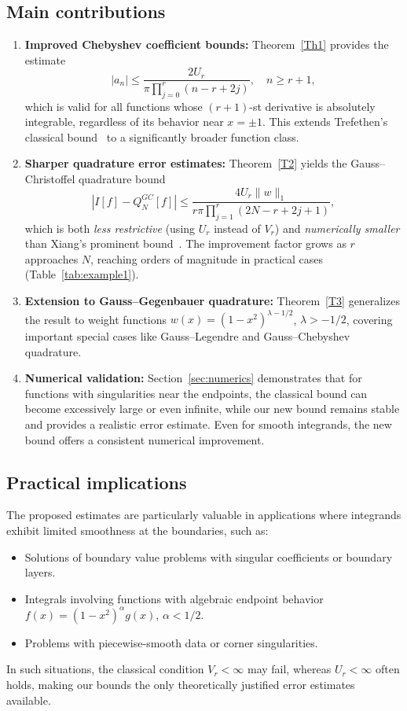 \documentclass[12pt,a4paper]{article}
\begin{document}
\subsection*{Main contributions}
\begin{enumerate}
    \item \textbf{Improved Chebyshev coefficient bounds:} Theorem~\ref{Th1} provides the estimate
    \[
    |a_n| \leq \frac{2U_r}{\pi\prod_{j=0}^{r}(n-r+2j)}, \quad n \ge r+1,
    \]
    which is valid for all functions whose $(r+1)$-st derivative is absolutely integrable, regardless of its behavior near $x = \pm 1$. This extends Trefethen's classical bound~\cite{LN} to a significantly broader function class.
    
    \item \textbf{Sharper quadrature error estimates:} Theorem~\ref{T2} yields the Gauss--Christoffel quadrature bound
    \[
    |I[f]-Q_N^{GC}[f]| \leq \frac{4U_r \|w\|_1}{r\pi \prod_{j=1}^{r}(2N-r+2j+1)},
    \]
    which is both \emph{less restrictive} (using $U_r$ instead of $V_r$) and \emph{numerically smaller} than Xiang's prominent bound~\cite{Xi}. The improvement factor grows as $r$ approaches $N$, reaching orders of magnitude in practical cases (Table~\ref{tab:example1}).
    
    \item \textbf{Extension to Gauss--Gegenbauer quadrature:} Theorem~\ref{T3} generalizes the result to weight functions $w(x) = (1-x^2)^{\lambda-1/2}$, $\lambda > -1/2$, covering important special cases like Gauss--Legendre and Gauss--Chebyshev quadrature.
    
    \item \textbf{Numerical validation:} Section~\ref{sec:numerics} demonstrates that for functions with singularities near the endpoints, the classical bound can become excessively large or even infinite, while our new bound remains stable and provides a realistic error estimate. Even for smooth integrands, the new bound offers a consistent numerical improvement.
\end{enumerate}

\subsection*{Practical implications}
The proposed estimates are particularly valuable in applications where integrands exhibit limited smoothness at the boundaries, such as:
\begin{itemize}
    \item Solutions of boundary value problems with singular coefficients or boundary layers.
    \item Integrals involving functions with algebraic endpoint behavior $f(x) = (1-x^2)^\alpha g(x)$, $\alpha < 1/2$.
    \item Problems with piecewise-smooth data or corner singularities.
\end{itemize}
In such situations, the classical condition $V_r < \infty$ may fail, whereas $U_r < \infty$ often holds, making our bounds the only theoretically justified error estimates available.
\end{document}
